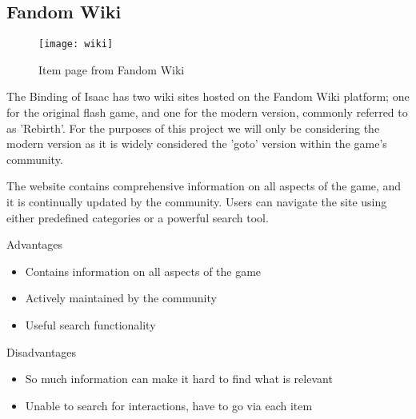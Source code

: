 \subsection*{Fandom Wiki}
\begin{figure}[H]
    \centering
    \texttt{[image: wiki]}
    \caption{Item page from Fandom Wiki}
\end{figure}
The Binding of Isaac has two wiki sites hosted on the Fandom Wiki platform; one for the original flash 
game\cite{BindingIsaacWiki}, and one for the modern version, commonly referred to as 'Rebirth'\cite{BindingIsaacRebirth}.
For the purposes of this project we will only be considering the modern version as it is widely considered the 'goto' 
version within the game's community.\par The website contains comprehensive information on all aspects of the game, 
and it is continually updated by the community. Users can navigate the site using either predefined categories or a 
powerful search tool. \par
Advantages
\begin{itemize}
    \item Contains information on all aspects of the game
    \item Actively maintained by the community
    \item Useful search functionality
\end{itemize}
Disadvantages
\begin{itemize}
    \item So much information can make it hard to find what is relevant
    \item Unable to search for interactions, have to go via each item 
\end{itemize}
